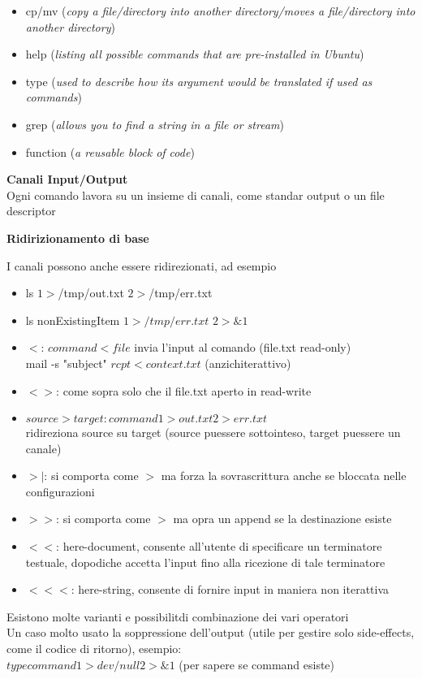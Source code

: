 \begin{flushleft}
\begin{itemize}
    \item cp/mv (\textit{copy a file/directory into another directory/moves a file/directory into another directory})
    \item help (\textit{listing all possible commands that are pre-installed in Ubuntu})
    \item type (\textit{used to describe how its argument would be translated if used as commands})
    \item grep (\textit{allows you to find a string in a file or stream})
    \item function (\textit{a reusable block of code})
  \end{itemize}
\end{flushleft}
\begin{flushleft}
  \textbf{Canali Input/Output} \\
  Ogni comando lavora su un insieme di canali, come standar output o un file descriptor 
\end{flushleft}
\begin{flushleft}
  \textbf{Ridirizionamento di base}\par 
  I canali possono anche essere ridirezionati, ad esempio
  \begin{itemize}
    \item ls $1>$/tmp/out.txt $2>$/tmp/err.txt
    \item ls nonExistingItem $1>/tmp/err.txt$ $2>\&1$
  \end{itemize}
  \begin{itemize}
    \item $<$: $command<file$ invia l'input al comando (file.txt read-only) \\
          mail -s "subject" $rcpt< context.txt$ (anzich\ace iterattivo)
    \item $<>$: come sopra solo che il file.txt \ace aperto in read-write
    \item $source>target: command 1>out.txt 2>err.txt$ \\
          ridireziona source su target (source pu\aco essere sottointeso, target pu\aco essere un canale)
    \item $>|$: si comporta come $>$ ma forza la sovrascrittura anche se bloccata nelle configurazioni
    \item $>>$: si comporta come $>$ ma opra un append se la destinazione esiste
    \item $<<$: here-document, consente all'utente di specificare  un terminatore testuale, dopodiche 
          accetta l'input fino alla ricezione di tale terminatore
    \item $<<<$: here-string, consente di fornire input in maniera non iterattiva
  \end{itemize}
  Esistono molte varianti e possibilit\aca di combinazione dei vari operatori \\
  Un caso molto usato \ace la soppressione dell'output (utile per gestire solo side-effects, come 
  il codice di ritorno), esempio:\\
  $type command 1>dev/null 2>\&1$ (per sapere se command esiste)
\end{flushleft}
